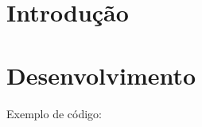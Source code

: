 









\textual


\chapter[Introdução]{Introdução}

\lipsum[11-12]

\chapter{Desenvolvimento}

Exemplo de código:

